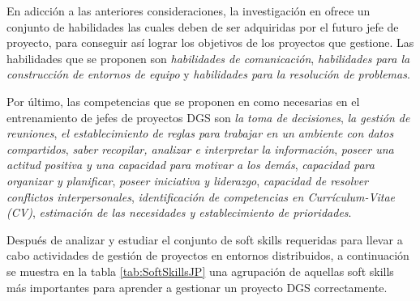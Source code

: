En adicción a las anteriores consideraciones, la investigación en \cite{sutling2015understanding} ofrece un conjunto de habilidades las cuales deben de ser adquiridas por el futuro jefe de proyecto, para conseguir así lograr los objetivos de los proyectos que gestione. Las habilidades que se proponen son \emph{habilidades de comunicación}, \emph{habilidades para la construcción de entornos de equipo} y \emph{habilidades para la resolución de problemas}.

Por último, las competencias que se proponen en \cite{saldana2014skills} como necesarias en el entrenamiento de jefes de proyectos DGS son \emph{la toma de decisiones}, \emph{la gestión de reuniones}, \emph{el establecimiento de reglas para trabajar en un ambiente con datos compartidos}, \emph{saber recopilar, analizar e interpretar la información}, \emph{poseer una actitud positiva y una capacidad para motivar a los demás}, \emph{capacidad para organizar y planificar}, \emph{poseer iniciativa y liderazgo}, \emph{capacidad de resolver conflictos interpersonales}, \emph{identificación de competencias en Currículum-Vitae (CV)}, \emph{estimación de las necesidades y establecimiento de prioridades}.

Después de analizar y estudiar el conjunto de soft skills requeridas para llevar a cabo actividades de gestión de proyectos en entornos distribuidos, a continuación se muestra en la tabla \ref{tab:SoftSkillsJP} una agrupación de aquellas soft skills más importantes para aprender a gestionar un proyecto DGS correctamente.

